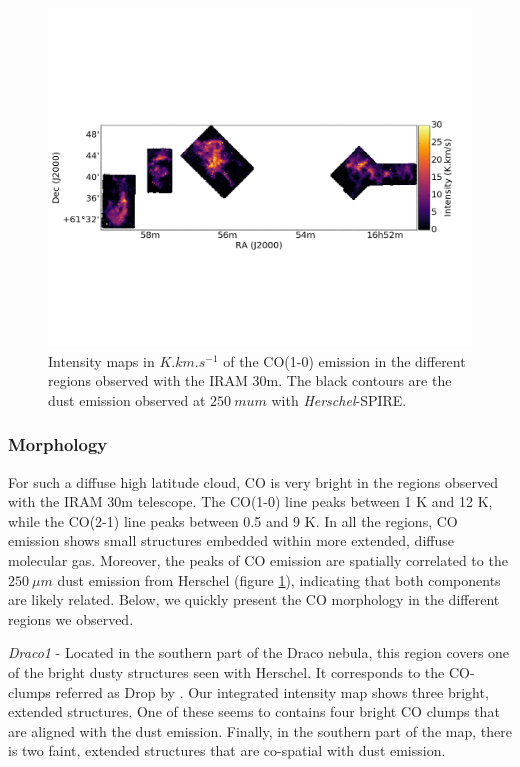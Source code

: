 \documentclass[traditabstract]{aa}
\begin{document}
\begin{figure}[h]
  \centering
  \includegraphics[width=\linewidth,trim=0 245 0 285,clip=true]{Figures/Draco_FRONT_intensity.png}
  \caption{\label{Draco_CO10} Intensity maps in $K.km.s^{-1}$ of the CO(1-0) emission in the different regions observed with the IRAM 30m. The black contours are the dust emission observed at $250\: mu m$ with \emph{Herschel}-SPIRE.}
\end{figure}


      \subsubsection{Morphology}

   For such a diffuse high latitude cloud, CO is very bright in the regions observed with the IRAM 30m telescope. The CO(1-0) line peaks between 1 K and 12 K, while the CO(2-1) line peaks between 0.5 and 9 K. In all the regions, CO emission shows small structures embedded within more extended, diffuse molecular gas. Moreover, the peaks of CO emission are spatially correlated to the $250\: \mu m$ dust emission from Herschel (figure \ref{Draco_CO10}), indicating that both components are likely related. Below, we quickly present the CO morphology in the different regions we observed.
\medskip

\noindent \textit{Draco1} - Located in the southern part of the Draco nebula, this region covers one of the bright dusty structures seen with Herschel. It corresponds to the CO-clumps referred as Drop by \cite{Mebold_1985}. Our integrated intensity map shows three bright, extended structures. One of these seems to contains four bright CO clumps that are aligned with the dust emission. Finally, in the southern part of the map, there is two faint, extended structures that are co-spatial with dust emission.
\medskip
\end{document}
